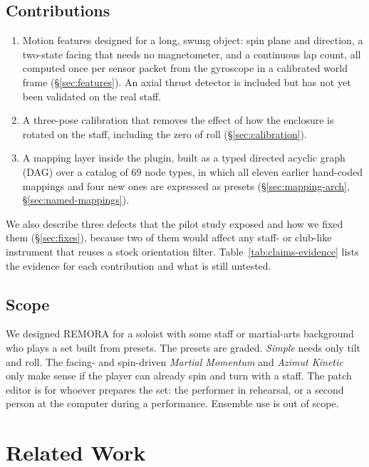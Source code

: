 \documentclass[sigconf,nonacm]{acmart}
\newcommand{\preset}[1]{\textit{#1}}
\begin{document}
\subsection{Contributions}
\begin{enumerate}
\item \label{claim:features} Motion features designed for a long, swung object: spin plane and
direction, a two-state facing that needs no magnetometer, and a continuous lap count, all computed
once per sensor packet from the gyroscope in a calibrated world frame (\S\ref{sec:features}). An
axial thrust detector is included but has not yet been validated on the real staff.
\item \label{claim:calibration} A three-pose calibration that removes the effect of how the
enclosure is rotated on the staff, including the zero of roll (\S\ref{sec:calibration}).
\item \label{claim:dag} A mapping layer inside the plugin, built as a typed directed acyclic graph
(DAG) over a catalog of 69 node types, in which all eleven earlier hand-coded mappings and four new
ones are expressed as presets (\S\ref{sec:mapping-arch}, \S\ref{sec:named-mappings}).
\end{enumerate}
We also describe three defects that the pilot study exposed and how we fixed them
(\S\ref{sec:fixes}), because two of them would affect any staff- or club-like instrument that
reuses a stock orientation filter. Table~\ref{tab:claims-evidence} lists the evidence for each
contribution and what is still untested.

\subsection{Scope}
We designed REMORA for a soloist with some staff or martial-arts background who plays a set built
from presets. The presets are graded. \preset{Simple} needs only tilt and roll. The facing- and
spin-driven \preset{Martial Momentum} and \preset{Azimut Kinetic} only make sense if the player can
already spin and turn with a staff. The patch editor is for whoever prepares the set: the performer
in rehearsal, or a second person at the computer during a performance. Ensemble use is out of scope.

\section{Related Work}
\label{sec:related}
\end{document}
